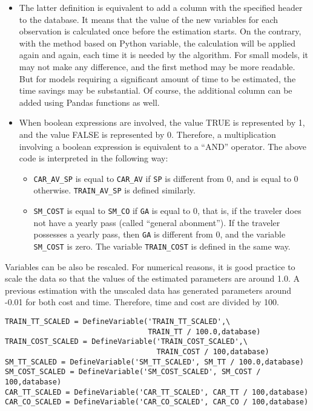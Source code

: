 \documentclass[12pt,a4paper]{article}
\begin{document}
\begin{itemize}
\item The latter definition is equivalent to add a column with the
specified header to the database. It means that the value of the new
variables for each observation is calculated once before the
estimation starts. On the contrary, with the method based on Python
variable, the calculation will be applied again and again, each time
it is needed by the algorithm. For small models, it may not make any
difference, and the first method may be more readable. But for models
requiring a significant amount of time to be estimated, the time
savings may be substantial. Of course, the additional column can be
added using Pandas functions as well. 

\item When boolean expressions are involved, the value TRUE is
  represented by 1, and the value FALSE is represented by
  0. Therefore, a multiplication involving a boolean expression is
  equivalent to a ``AND'' operator. The above code is interpreted in
  the following way:
\begin{itemize}
\item \lstinline$CAR_AV_SP$ is equal to \lstinline$CAR_AV$ if
  \lstinline$SP$ is different from 0, and is equal to 0
  otherwise. \lstinline$TRAIN_AV_SP$ is defined similarly.
\item \lstinline$SM_COST$ is equal to \lstinline$SM_CO$ if
  \lstinline$GA$ is equal to 0, that is, if the traveler does not have
  a yearly pass (called ``general abonment''). If the traveler
  possesses a yearly pass, then \lstinline$GA$ is different from 0,
  and the variable \lstinline$SM_COST$ is zero. The variable
  \lstinline$TRAIN_COST$ is defined in the same way.
\end{itemize}
\end{itemize}

Variables can be also be rescaled. For numerical reasons, it is good
practice to scale the data so that the values of the estimated parameters are around 1.0. A previous estimation with the unscaled data has generated
parameters around -0.01 for both cost and time. Therefore, 
time and cost are divided by 100.

\begin{lstlisting}[style=nonumbers]
TRAIN_TT_SCALED = DefineVariable('TRAIN_TT_SCALED',\
                                 TRAIN_TT / 100.0,database)
TRAIN_COST_SCALED = DefineVariable('TRAIN_COST_SCALED',\
                                   TRAIN_COST / 100,database)
SM_TT_SCALED = DefineVariable('SM_TT_SCALED', SM_TT / 100.0,database)
SM_COST_SCALED = DefineVariable('SM_COST_SCALED', SM_COST / 100,database)
CAR_TT_SCALED = DefineVariable('CAR_TT_SCALED', CAR_TT / 100,database)
CAR_CO_SCALED = DefineVariable('CAR_CO_SCALED', CAR_CO / 100,database)
\end{lstlisting}
\end{document}
